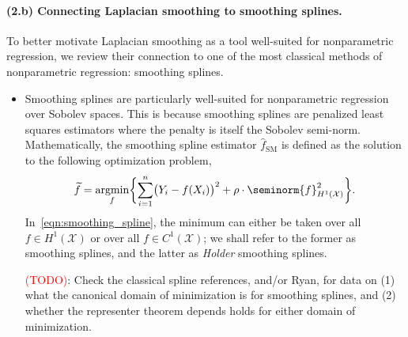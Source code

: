 \documentclass{article}
\newcommand{\1}{\mathbf{1}}
\DeclareMathOperator*{\argmin}{argmin}
\newcommand{\Xset}{\mathcal{X}}
\newcommand{\wt}[1]{\widetilde{#1}}
\newcommand{\wh}[1]{\widehat{#1}}
\newcommand{\SM}{\mathrm{SM}}
\theoremstyle{alden}
\theoremstyle{aldenthm}
\theoremstyle{definition}
\theoremstyle{remark}
\begin{document}
\paragraph{(2.b) Connecting Laplacian smoothing to smoothing splines.} 
To better motivate Laplacian smoothing as a tool well-suited for nonparametric regression, we review their connection to one of the most classical methods of nonparametric regression: smoothing splines.
\begin{itemize}
	\item Smoothing splines are particularly well-suited for nonparametric regression over Sobolev spaces. This is because smoothing splines are penalized least squares estimators where the penalty is itself the Sobolev semi-norm. Mathematically, the smoothing spline estimator $\wh{f}_{\SM}$ is defined as the solution to the following optimization problem,
	\begin{equation}
	\label{eqn:smoothing_spline}
	\wt{f} = \argmin_{f} \biggl\{\sum_{i = 1}^{n} \bigl(Y_i - f(X_i)\bigr)^2 + \rho \cdot \seminorm{f}_{H^{1}(\Xset)}^2\biggr\}.
	\end{equation}
	In~\eqref{eqn:smoothing_spline}, the minimum can either be taken over all $f \in H^1(\Xset)$ or over all $f \in C^1(\Xset)$; we shall refer to the former as smoothing splines, and the latter as \emph{Holder} smoothing splines.
	
	\textcolor{red}{(TODO)}: Check the classical spline references, and/or Ryan, for data on (1) what the canonical domain of minimization is for smoothing splines, and (2) whether the representer theorem depends holds for either domain of minimization.
	

\end{itemize}
\end{document}
